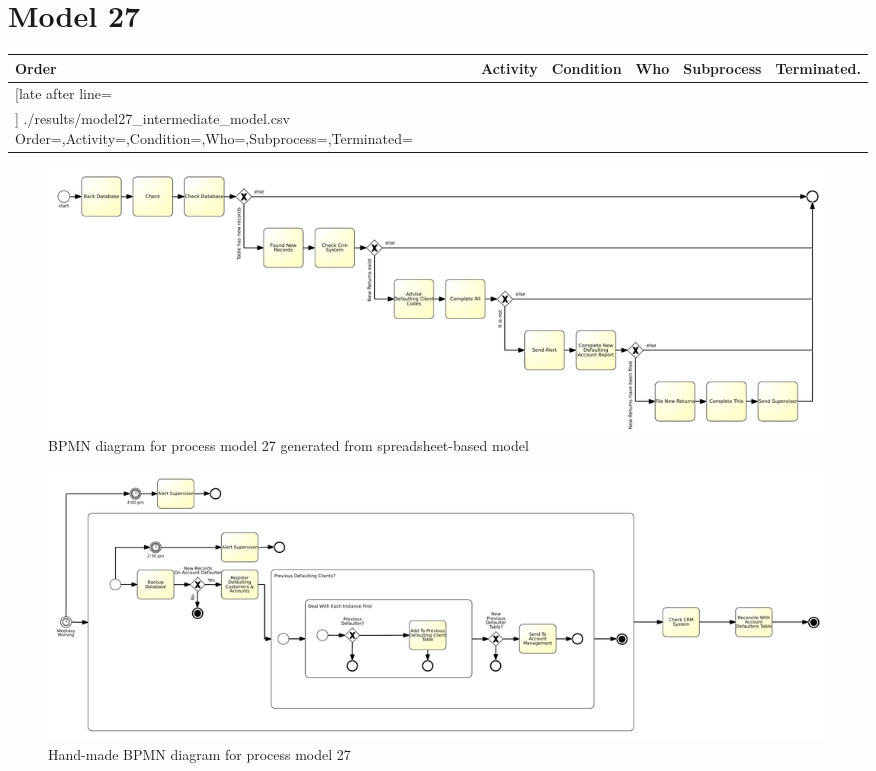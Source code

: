 \section{Model 27}
\begin{tcolorbox}[
	breakable,
	arc=0mm,
	left=1pt,
	right = 1pt,
	boxrule=0mm,
	colback = {white},
	]
	\texttt{}
\end{tcolorbox}
\label{txt:model27}

{\scriptsize
	\begin{longtable}{|p{0.03 \hsize}|p{0.25 \hsize}|p{0.15 \hsize}|p{0.2 \hsize}|p{0.1 \hsize}|p{0.1 \hsize}|}
		\hline
		Order & Activity & Condition & Who & Subprocess & Terminated.
		\\\hline\hline
		\csvreader[late after line=\\\hline]
		{./results/model27_intermediate_model.csv}
		{Order=\Order,Activity=\Activity,Condition=\Condition,Who=\Who,Subprocess=\Subprocess,Terminated=\Terminated}
		{\Order & \Activity & \Condition & \Who & \Subprocess & \Terminated}
		\caption{Spreadsheet-based description for process model 27}
		\label{csv:model27}
	\end{longtable}
}

\begin{figure}[H]
	\centering
	\includegraphics[width=\hsize]{./generated_bpmn/model27.pdf}
	\caption{BPMN diagram for process model 27 generated from spreadsheet-based model}
	\label{bpmn:generated_model27}
\end{figure}

\begin{figure}[H]
	\centering
	\includegraphics[width=\hsize]{./bpmn/model27.pdf}
	\caption{Hand-made BPMN diagram for process model 27}
	\label{bpmn:model27}
\end{figure}

